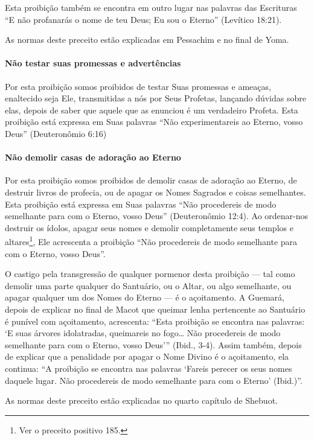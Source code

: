 Esta proibição também se encontra em outro lugar nas palavras das
Escrituras ``E não profanarás o nome de teu Deus; Eu sou o Eterno''
(Levítico 18:21).

As normas deste preceito estão explicadas em Pessachim e no final de Yoma.

\paragraph{Não testar suas promessas e advertências}

Por esta proibição somos proibidos de testar Suas promessas e ameaças,
enaltecido seja Ele, transmitidas a nós por Seus Profetas, lançando
dúvidas sobre elas, depois de saber que aquele que as enunciou é um
verdadeiro Profeta. Esta proibição está expressa em Suas palavras ``Não
experimentareis ao Eterno, vosso Deus'' (Deuteronômio 6:16)

\paragraph{Não demolir casas de adoração ao Eterno}

Por esta proibição somos proibidos de demolir casas de adoração ao
Eterno, de destruir livros de profecia, ou de apagar os Nomes Sagrados e
coisas semelhantes. Esta proibição está expressa em Suas palavras ``Não
procedereis de modo semelhante para com o Eterno, vosso Deus''
(Deuteronômio 12:4). Ao ordenar-nos destruir os ídolos, apagar seus
nomes e demolir completamente seus templos e
altares\footnote{Ver o preceito positivo 185.}, Ele acrescenta a proibição ``Não
procedereis de modo semelhante para com o Eterno, vosso Deus''.

O castigo pela transgressão de qualquer pormenor desta proibição --- tal
como demolir uma parte qualquer do Santuário, ou o Altar, ou algo
semelhante, ou apagar qualquer um dos Nomes do Eterno --- é o
açoitamento. A Guemará, depois de explicar no final de Macot que queimar
lenha pertencente ao Santuário é punível com açoitamento, acrescenta:
``Esta proibição se encontra nas palavras: `E suas árvores idolatradas,
queimareis no fogo\ldots{} Não procedereis de modo semelhante para com o
Eterno, vosso Deus''' (Ibid., 3-4). Assim também, depois de explicar
que a penalidade por apagar o Nome Divino é o açoitamento, ela continua:
``A proibição se encontra nas palavras `Fareis perecer os seus nomes
daquele lugar. Não procedereis de modo semelhante para com o Eterno'
(Ibid.)''.

As normas deste preceito estão explicadas no quarto capítulo de Shebuot.

